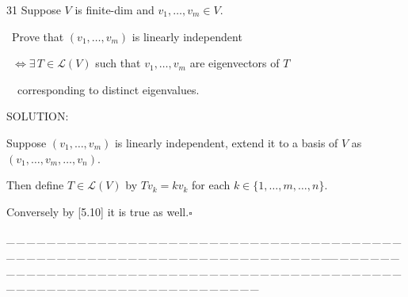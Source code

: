 \documentclass[a4paper, 11pt, UTF8]{article}
\def\Lm{\mathcal{L}}
\begin{document}
\begin{large}
{\timesbf\Large 31} {\timessl\Large 
Suppose $V$ is finite-dim and $v_1,\dots,v_m \in V$.}\par\quad\,
{\timessl\Large Prove that $(v_1,\dots,v_m)$ is linearly independent}\par\quad\,
{\timessl\Large $\Longleftrightarrow\exists\,T\in\Lm(V)$ such that $v_1,\dots,v_m$ are eigenvectors of $T$}\par\qquad\quad\,\,\,\,
{\timessl\Large corresponding to distinct eigenvalues.}\par
{\timesbf S\footnotesize{OLUTION:}}\par\quad
Suppose $(v_1,\dots,v_m)$ is linearly independent, extend it to a basis of $V$ as $(v_1,\dots,v_m,\dots,v_n)$.\par\quad
Then define $T\in\Lm(V)$ by $Tv_k=kv_k$ for each $k\in\{1,\dots,m,\dots,n\}.$\par\quad
Conversely by [5.10] it is true as well.\quad$\square$
\par
{\tiny \_\,\_\,\_\,\_\,\_\,\_\,\_\,\_\,\_\,\_\,\_\,\_\,\_\,\_\,\_\,\_\,\_\,\_\,\_\,\_\,\_\,\_\,\_\,\_\,\_\,\_\,\_\,\_\,\_\,\_\,\_\,\_\,\_\,\_\,\_\,\_\,\_\,\_\,\_\,\_\,\_\,\_\,\_\,\_\,\_\,\_\,\_\,\_\,\_\,\_\,\_\,\_\,\_\,\_\,\_\,\_\,\_\,\_\,\_\,\_\,\_\,\_\,\_\,\_\,\_\,\_\,\_\,\_\,\_\,\_\,\_\_\,\_\,\_\,\_\,\_\,\_\,\_\,\_\,\_\,\_\,\_\,\_\,\_\,\_\,\_\,\_\,\_\,\_\,\_\,\_\,\_\,\_\,\_\,\_\,\_\,\_\,\_\,\_\,\_\,\_\,\_\,\_\,\_\,\_\,\_\,\_\,\_\,\_\,\_\,\_\,\_\,\_\,\_\,\_\,\_\,\_\,\_\,\_\,\_\,\_\,\_\,\_\,\_\,\_\,\_\,\_\,\_\,\_\,\_\,\_\,\_\,\_\,\_\,\_\,\_\,\_\,\_\,\_\,\_\,\_\,\_}\par


\end{large}
\end{document}
